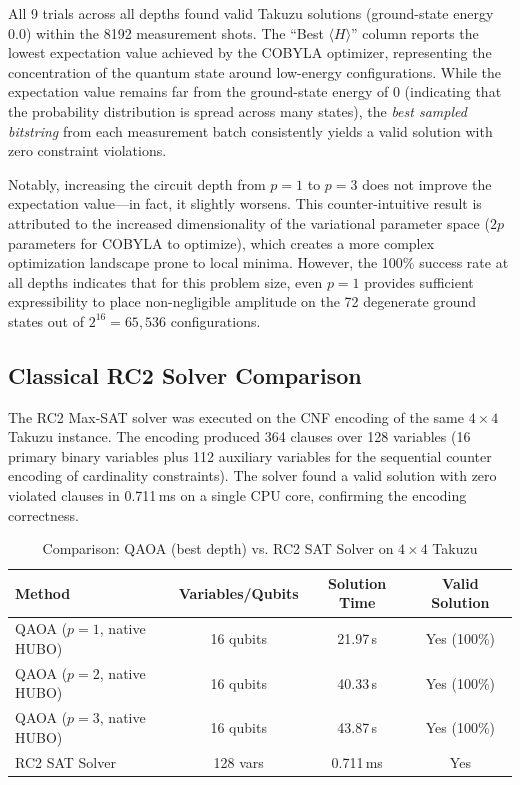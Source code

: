 \documentclass[eng]{ajceam-class}
\begin{document}
All 9 trials across all depths found valid Takuzu solutions (ground-state energy 0.0) within the 8192 measurement shots. The ``Best $\langle H \rangle$'' column reports the lowest expectation value achieved by the COBYLA optimizer, representing the concentration of the quantum state around low-energy configurations. While the expectation value remains far from the ground-state energy of 0 (indicating that the probability distribution is spread across many states), the \emph{best sampled bitstring} from each measurement batch consistently yields a valid solution with zero constraint violations.

Notably, increasing the circuit depth from $p=1$ to $p=3$ does not improve the expectation value---in fact, it slightly worsens. This counter-intuitive result is attributed to the increased dimensionality of the variational parameter space ($2p$ parameters for COBYLA to optimize), which creates a more complex optimization landscape prone to local minima. However, the 100\% success rate at all depths indicates that for this problem size, even $p=1$ provides sufficient expressibility to place non-negligible amplitude on the 72 degenerate ground states out of $2^{16} = 65{,}536$ configurations.

\subsection{Classical RC2 Solver Comparison}

The RC2 Max-SAT solver was executed on the CNF encoding of the same $4 \times 4$ Takuzu instance. The encoding produced 364 clauses over 128 variables (16 primary binary variables plus 112 auxiliary variables for the sequential counter encoding of cardinality constraints). The solver found a valid solution with zero violated clauses in 0.711\,ms on a single CPU core, confirming the encoding correctness.

\begin{table}[h]
\centering
\caption{Comparison: QAOA (best depth) vs. RC2 SAT Solver on $4 \times 4$ Takuzu}
\begin{tabular}{|l|c|c|c|}
\hline
\textbf{Method} & \textbf{Variables/Qubits} & \textbf{Solution Time} & \textbf{Valid Solution} \\
\hline
QAOA ($p=1$, native HUBO) & 16 qubits & 21.97\,s & Yes (100\%) \\
QAOA ($p=2$, native HUBO) & 16 qubits & 40.33\,s & Yes (100\%) \\
QAOA ($p=3$, native HUBO) & 16 qubits & 43.87\,s & Yes (100\%) \\
RC2 SAT Solver & 128 vars & 0.711\,ms & Yes \\
\hline
\end{tabular}
\label{tab:comparison}
\end{table}
\end{document}
